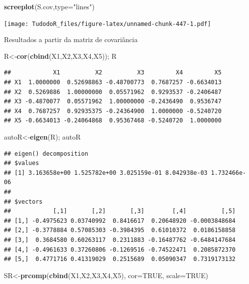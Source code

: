 \documentclass[
]{book}
\newenvironment{Shaded}{\begin{snugshade}}{\end{snugshade}}
\newcommand{\DataTypeTok}[1]{\textcolor[rgb]{0.13,0.29,0.53}{#1}}
\newcommand{\KeywordTok}[1]{\textcolor[rgb]{0.13,0.29,0.53}{\textbf{#1}}}
\newcommand{\NormalTok}[1]{#1}
\newcommand{\OtherTok}[1]{\textcolor[rgb]{0.56,0.35,0.01}{#1}}
\newcommand{\StringTok}[1]{\textcolor[rgb]{0.31,0.60,0.02}{#1}}
\begin{document}
\begin{Shaded}
\begin{Highlighting}[]
\KeywordTok{screeplot}\NormalTok{(S.cov,}\DataTypeTok{type=}\StringTok{"lines"}\NormalTok{)}
\end{Highlighting}
\end{Shaded}

\texttt{[image: TudodoR\_files/figure-latex/unnamed-chunk-447-1.pdf]}

Resultados a partir da matriz de covariância

\begin{Shaded}
\begin{Highlighting}[]
\NormalTok{R<-}\KeywordTok{cor}\NormalTok{(}\KeywordTok{cbind}\NormalTok{(X1,X2,X3,X4,X5)); }
\NormalTok{R}
\end{Highlighting}
\end{Shaded}

\begin{verbatim}
##            X1          X2          X3         X4         X5
## X1  1.0000000  0.52698863 -0.48700773  0.7687257 -0.6634013
## X2  0.5269886  1.00000000  0.05571962  0.9293537 -0.2406487
## X3 -0.4870077  0.05571962  1.00000000 -0.2436490  0.9536747
## X4  0.7687257  0.92935375 -0.24364900  1.0000000 -0.5240720
## X5 -0.6634013 -0.24064868  0.95367468 -0.5240720  1.0000000
\end{verbatim}

\begin{Shaded}
\begin{Highlighting}[]
\NormalTok{autoR<-}\KeywordTok{eigen}\NormalTok{(R);}
\NormalTok{autoR}
\end{Highlighting}
\end{Shaded}

\begin{verbatim}
## eigen() decomposition
## $values
## [1] 3.163658e+00 1.525782e+00 3.025159e-01 8.042938e-03 1.732466e-06
## 
## $vectors
##            [,1]       [,2]       [,3]        [,4]          [,5]
## [1,] -0.4975623 0.03740992  0.8416617  0.20648920 -0.0003848684
## [2,] -0.3778884 0.57085303 -0.3984395  0.61010372  0.0186158858
## [3,]  0.3684580 0.60263117  0.2311883 -0.16487762 -0.6484147684
## [4,] -0.4961633 0.37260806 -0.1269516 -0.74522471  0.2085872370
## [5,]  0.4771716 0.41319029  0.2515689  0.05090347  0.7319173132
\end{verbatim}

\begin{Shaded}
\begin{Highlighting}[]
\NormalTok{SR<-}\KeywordTok{prcomp}\NormalTok{(}\KeywordTok{cbind}\NormalTok{(X1,X2,X3,X4,X5), }\DataTypeTok{cor=}\OtherTok{TRUE}\NormalTok{, }\DataTypeTok{scale=}\OtherTok{TRUE}\NormalTok{)}
\end{Highlighting}
\end{Shaded}
\end{document}
